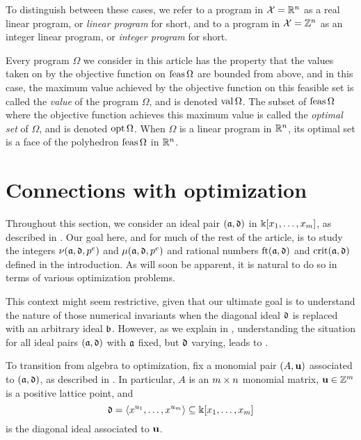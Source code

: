 \documentclass{amsart}
\begin{document}
To distinguish between these cases, we refer to a program in $\mathcal{X} = \mathbb{R}^n$ as a {real linear program}, or \emph{linear program} for short, and to a program in $\mathcal{X}=\mathbb{Z}^n$ as an {integer linear program}, or \emph{integer program} for short.

Every program $\Omega$ we consider in this article has the property that the values taken on by the objective function on $\operatorname{feas} \Omega$ are bounded from above, and in this case, the maximum value achieved by the objective function on this feasible set is called the \emph{value} of the program $\Omega$, and is denoted $\operatorname{val} \Omega$.  The subset of $\operatorname{feas} \Omega$ where the objective function achieves this maximum value is called the \emph{optimal set} of $\Omega$, and is denoted $\operatorname{opt} \Omega$.   When $\Omega$ is a linear program in $\mathbb{R}^n$, its optimal set is a face of the polyhedron $\operatorname{feas} \Omega$ in $\mathbb{R}^n$.

\section{Connections with optimization}
\label{sec: LPs}

Throughout this section, we consider an ideal pair $(\mathfrak{a}, \mathfrak{d})$ in $\Bbbk[x_1, \ldots, x_{m}]$, as described in .
Our goal here, and for much of the rest of the article, is to study the integers $\nu(\mathfrak{a}, \mathfrak{d}, p^e)$ and $\mu(\mathfrak{a}, \mathfrak{d}, p^e)$ and rational numbers $\operatorname{ft}(\mathfrak{a}, \mathfrak{d})$ and $\operatorname{crit}(\mathfrak{a}, \mathfrak{d})$ defined in the introduction.
As will soon be apparent, it is natural to do so in terms of various optimization problems.

\begin{remark} \label{reduction to diagonal :R}
   This context might seem restrictive, given that our ultimate goal is to understand the nature of those numerical invariants when the diagonal ideal $\mathfrak{d}$ is replaced with an arbitrary ideal $\mathfrak{b}$.
   However, as we explain in , understanding the situation for all ideal pairs $(\mathfrak{a}, \mathfrak{d})$ with $\mathfrak{a}$ fixed, but $\mathfrak{d}$ varying, leads to .
\end{remark}

To transition from algebra to optimization, fix a monomial pair $(A, \mathbf{u})$ associated to $(\mathfrak{a}, \mathfrak{d})$, as described in .  In particular, $A$ is an $m \times n$ monomial matrix, $\mathbf{u} \in \mathbb{Z}^m$ is a positive lattice point, and
\[ \mathfrak{d} = \langle x^{u_1}, \ldots, x^{u_{m}} \rangle \subseteq \Bbbk[x_1, \ldots, x_{m}] \] is the diagonal ideal associated to $\mathbf{u}$.
\end{document}

